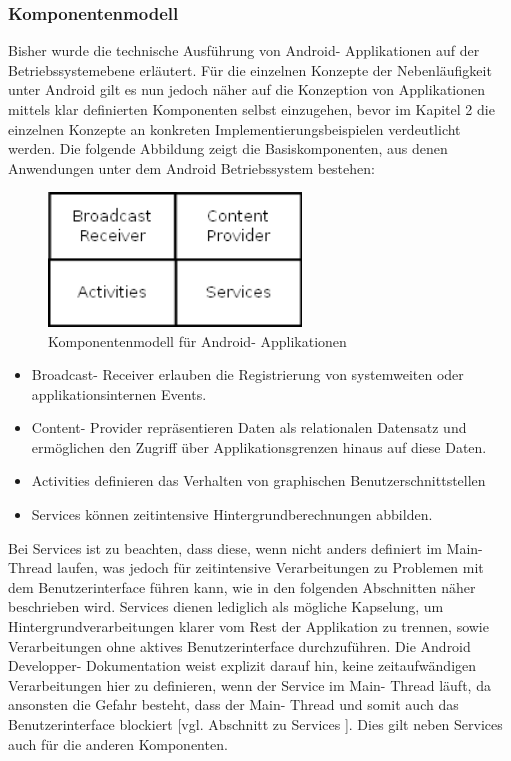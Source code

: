 \documentclass[12pt,oneside,a4paper,bibtotoc,liststotoc]{scrreprt}
\begin{document}
\subsubsection{Komponentenmodell}
Bisher wurde die technische Ausführung von Android- Applikationen auf der Betriebssystemebene erläutert. Für die einzelnen Konzepte der Nebenläufigkeit unter Android gilt es nun jedoch näher auf die Konzeption von Applikationen mittels klar definierten Komponenten selbst einzugehen, bevor im Kapitel 2 die einzelnen Konzepte an konkreten Implementierungsbeispielen verdeutlicht werden. Die folgende Abbildung zeigt die Basiskomponenten, aus denen Anwendungen unter dem Android Betriebssystem bestehen:
\begin{figure}[H]
  \begin{centering}
    \includegraphics[width=0.6\textwidth]{img/Android_Komponent_Model.png}
    \caption{Komponentenmodell für Android- Applikationen}
    \label{Android_Komponent_Model}
  \end{centering}
\end{figure}
\begin{itemize}
\item Broadcast- Receiver erlauben die Registrierung von systemweiten oder applikationsinternen Events.
\item Content- Provider repräsentieren Daten als relationalen Datensatz und ermöglichen den Zugriff über Applikationsgrenzen hinaus auf diese Daten.
\item Activities definieren das Verhalten von graphischen Benutzerschnittstellen
\item Services können zeitintensive Hintergrundberechnungen abbilden. 
\end{itemize}
Bei Services ist zu beachten, dass diese, wenn nicht anders definiert im Main- Thread laufen, was jedoch für zeitintensive Verarbeitungen zu Problemen mit dem Benutzerinterface führen kann, wie in den folgenden Abschnitten näher beschrieben wird. Services dienen lediglich als mögliche Kapselung, um Hintergrundverarbeitungen klarer vom Rest der Applikation zu trennen, sowie Verarbeitungen ohne aktives Benutzerinterface durchzuführen. Die Android Developper- Dokumentation weist explizit darauf hin, keine zeitaufwändigen Verarbeitungen hier zu definieren, wenn der Service im Main- Thread läuft, da ansonsten die Gefahr besteht, dass der Main- Thread und somit auch das Benutzerinterface blockiert [vgl. Abschnitt zu Services \citet{androidDevDocu}]. Dies gilt neben Services auch für die anderen Komponenten.
\end{document}
